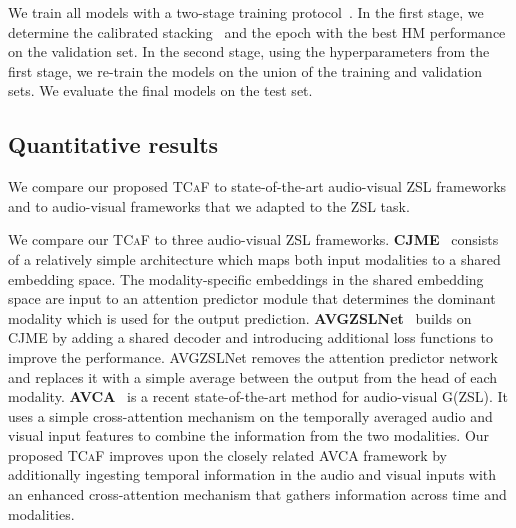 \documentclass[runningheads]{llncs}
\newcommand{\mypara}[1]{\noindent{\bf{#1}}}
\newcommand{\modelName}{\textsc{TCaF}\xspace}
\begin{document}
We train all models with a two-stage training protocol~\cite{mercea2022}. In the first stage, we determine the calibrated stacking~\cite{chao2016empirical} and the epoch with the best HM performance on the validation set. In the second stage, using the hyperparameters from the first stage, we re-train the models on the union of the training and validation sets. We evaluate the final models on the test set.




\subsection{Quantitative results}\label{sec:sota}
We compare our proposed \modelName to state-of-the-art audio-visual ZSL frameworks and to audio-visual frameworks that we adapted to the ZSL task. 

\mypara{Audio-visual ZSL baselines.} We compare our \modelName to three audio-visual ZSL frameworks. \textbf{CJME}~\cite{parida2020coordinated} consists of a relatively simple architecture which maps both input modalities to a shared embedding space. The modality-specific embeddings in the shared embedding space are input to an attention predictor module that determines the dominant modality which is used for the output prediction.
\textbf{AVGZSLNet}~\cite{mazumder2021avgzslnet} builds on CJME by adding a shared decoder and introducing additional loss functions to improve the performance. 
AVGZSLNet removes the attention predictor network and replaces it with a simple average between the output from the head of each modality. 
\textbf{AVCA}~\cite{mercea2022} is a recent state-of-the-art method for audio-visual G(ZSL). It uses a simple cross-attention mechanism on the temporally averaged audio and visual input features to combine the information from the two modalities. Our proposed \modelName{} improves upon the closely related AVCA framework by additionally ingesting temporal information in the audio and visual inputs with an enhanced cross-attention mechanism that gathers information across time and modalities.
\end{document}
